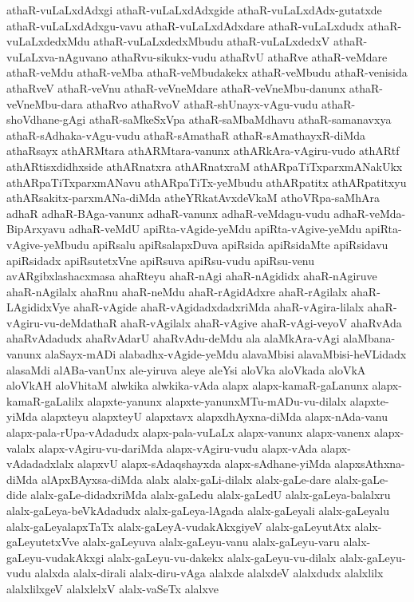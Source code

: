 {athaR-vuLaLxdAdxgi
athaR-vuLaLxdAdxgide
athaR-vuLaLxdAdx-gutatxde
athaR-vuLaLxdAdxgu-vavu
athaR-vuLaLxdAdxdare
athaR-vuLaLxdudx
athaR-vuLaLxdedxMdu
athaR-vuLaLxdedxMbudu
athaR-vuLaLxdedxV
athaR-vuLaLxva-nAguvano
athaRvu-sikukx-vudu
athaRvU
athaRve
athaR-veMdare
athaR-veMdu
athaR-veMba
athaR-veMbudakekx
athaR-veMbudu
athaR-venisida
athaRveV
athaR-veVnu
athaR-veVneMdare
athaR-veVneMbu-danunx
athaR-veVneMbu-dara
athaRvo
athaRvoV
athaR-shUnayx-vAgu-vudu
athaR-shoVdhane-gAgi
athaR-saMkeSxVpa
athaR-saMbaMdhavu
athaR-samanavxya
athaR-sAdhaka-vAgu-vudu
athaR-sAmathaR
athaR-sAmathayxR-diMda
athaRsayx
athARMtara
athARMtara-vanunx
athARkAra-vAgiru-vudo
athARtf
athARtisxdidhxside
athARnatxra
athARnatxraM
athARpaTiTxparxmANakUkx
athARpaTiTxparxmANavu
athARpaTiTx-yeMbudu
athARpatitx
athARpatitxyu
athARsakitx-parxmANa-diMda
atheYRkatAvxdeVkaM
athoVRpa-saMhAra
adhaR
adhaR-BAga-vanunx
adhaR-vanunx
adhaR-veMdagu-vudu
adhaR-veMda-BipArxyavu
adhaR-veMdU
apiRta-vAgide-yeMdu
apiRta-vAgive-yeMdu
apiRta-vAgive-yeMbudu
apiRsalu
apiRsalapxDuva
apiRsida
apiRsidaMte
apiRsidavu
apiRsidadx
apiRsutetxVne
apiRsuva
apiRsu-vudu
apiRsu-venu
avARgibxlashacxmasa
ahaRteyu
ahaR-nAgi
ahaR-nAgididx
ahaR-nAgiruve
ahaR-nAgilalx
ahaRnu
ahaR-neMdu
ahaR-rAgidAdxre
ahaR-rAgilalx
ahaR-LAgididxVye
ahaR-vAgide
ahaR-vAgidadxdadxriMda
ahaR-vAgira-lilalx
ahaR-vAgiru-vu-deMdathaR
ahaR-vAgilalx
ahaR-vAgive
ahaR-vAgi-veyoV
ahaRvAda
ahaRvAdadudx
ahaRvAdarU
ahaRvAdu-deMdu
ala
alaMkAra-vAgi
alaMbana-vanunx
alaSayx-mADi
alabadhx-vAgide-yeMdu
alavaMbisi
alavaMbisi-heVLidadx
alasaMdi
alABa-vanUnx
ale-yiruva
aleye
aleYsi
aloVka
aloVkada
aloVkA
aloVkAH
aloVhitaM
alwkika
alwkika-vAda
alapx
alapx-kamaR-gaLanunx
alapx-kamaR-gaLalilx
alapxte-yanunx
alapxte-yanunxMTu-mADu-vu-dilalx
alapxte-yiMda
alapxteyu
alapxteyU
alapxtavx
alapxdhAyxna-diMda
alapx-nAda-vanu
alapx-pala-rUpa-vAdadudx
alapx-pala-vuLaLx
alapx-vanunx
alapx-vanenx
alapx-valalx
alapx-vAgiru-vu-dariMda
alapx-vAgiru-vudu
alapx-vAda
alapx-vAdadadxlalx
alapxvU
alapx-sAdaqshayxda
alapx-sAdhane-yiMda
alapxsAthxna-diMda
alApxBAyxsa-diMda
alalx
alalx-gaLi-dilalx
alalx-gaLe-dare
alalx-gaLe-dide
alalx-gaLe-didadxriMda
alalx-gaLedu
alalx-gaLedU
alalx-gaLeya-balalxru
alalx-gaLeya-beVkAdadudx
alalx-gaLeya-lAgada
alalx-gaLeyali
alalx-gaLeyalu
alalx-gaLeyalapxTaTx
alalx-gaLeyA-vudakAkxgiyeV
alalx-gaLeyutAtx
alalx-gaLeyutetxVve
alalx-gaLeyuva
alalx-gaLeyu-vanu
alalx-gaLeyu-varu
alalx-gaLeyu-vudakAkxgi
alalx-gaLeyu-vu-dakekx
alalx-gaLeyu-vu-dilalx
alalx-gaLeyu-vudu
alalxda
alalx-dirali
alalx-diru-vAga
alalxde
alalxdeV
alalxdudx
alalxlilx
alalxlilxgeV
alalxlelxV
alalx-vaSeTx
alalxve
}
